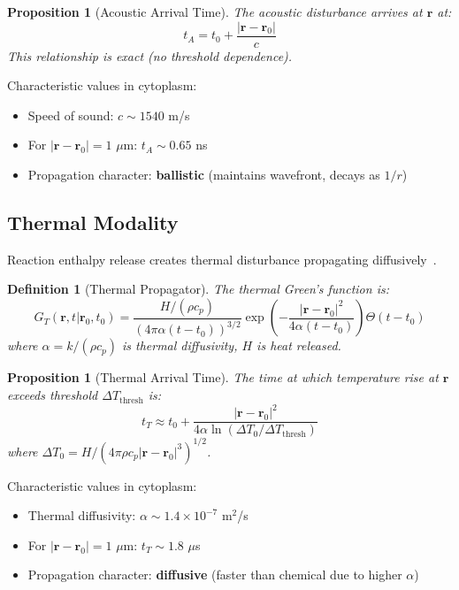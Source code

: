 \documentclass[11pt,a4paper]{article}
\newtheorem{definition}[theorem]{Definition}
\newtheorem{proposition}[theorem]{Proposition}
\theoremstyle{remark}
\newcommand{\rxnpos}{\mathbf{r}_0}
\newcommand{\rxntime}{t_0}
\newcommand{\obspos}{\mathbf{r}}
\begin{document}
\begin{proposition}[Acoustic Arrival Time]
\label{prop:acoustic_arrival}
The acoustic disturbance arrives at $\obspos$ at:
\begin{equation}
    t_A = \rxntime + \frac{|\obspos - \rxnpos|}{c}
\end{equation}
This relationship is exact (no threshold dependence).
\end{proposition}

Characteristic values in cytoplasm:
\begin{itemize}
    \item Speed of sound: $c \sim 1540$ m/s
    \item For $|\obspos - \rxnpos| = 1$ $\mu$m: $t_A \sim 0.65$ ns
    \item Propagation character: \textbf{ballistic} (maintains wavefront, decays as $1/r$)
\end{itemize}

\subsection{Thermal Modality}

Reaction enthalpy release creates thermal disturbance propagating diffusively~\citep{kreith2010principles,baffou2014applications}.

\begin{definition}[Thermal Propagator]
The thermal Green's function is:
\begin{equation}
    G_T(\mathbf{r}, t | \rxnpos, \rxntime) = \frac{H/(\rho c_p)}{(4\pi \alpha (t-\rxntime))^{3/2}} \exp\left(-\frac{|\mathbf{r} - \rxnpos|^2}{4\alpha(t-\rxntime)}\right) \Theta(t - \rxntime)
\end{equation}
where $\alpha = k/(\rho c_p)$ is thermal diffusivity, $H$ is heat released.
\end{definition}

\begin{proposition}[Thermal Arrival Time]
\label{prop:thermal_arrival}
The time at which temperature rise at $\obspos$ exceeds threshold $\Delta T_{\text{thresh}}$ is:
\begin{equation}
    t_T \approx \rxntime + \frac{|\obspos - \rxnpos|^2}{4\alpha \ln(\Delta T_0/\Delta T_{\text{thresh}})}
\end{equation}
where $\Delta T_0 = H/(4\pi \rho c_p |\obspos - \rxnpos|^3)^{1/2}$.
\end{proposition}

Characteristic values in cytoplasm:
\begin{itemize}
    \item Thermal diffusivity: $\alpha \sim 1.4 \times 10^{-7}$ m$^2$/s
    \item For $|\obspos - \rxnpos| = 1$ $\mu$m: $t_T \sim 1.8$ $\mu$s
    \item Propagation character: \textbf{diffusive} (faster than chemical due to higher $\alpha$)
\end{itemize}
\end{document}
